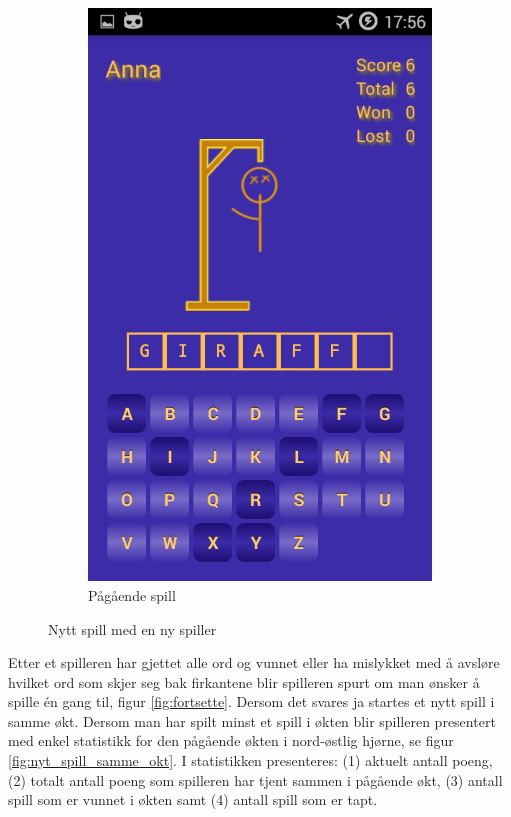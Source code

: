 \begin{figure}[ht]
\begin{subfigure}[b]{0.25\textwidth}
        \includegraphics[width=\textwidth]{./img/bruksanvisning/4.png}
        \caption{Pågående spill}
        \label{fig:spill_igang}
    \end{subfigure}
    \caption{Nytt spill med en ny spiller}\label{fig:new_game_activities}
\end{figure}

Etter et spilleren har gjettet alle ord og vunnet eller ha mislykket med å avsløre hvilket ord som skjer seg bak firkantene blir spilleren spurt om man ønsker å spille én gang til, figur \ref{fig:fortsette}. Dersom det svares ja startes et nytt spill i samme økt. Dersom man har spilt minst et spill i økten blir spilleren presentert med enkel statistikk for den pågående økten i nord-østlig hjørne, se figur \ref{fig:nyt_spill_samme_okt}. I statistikken presenteres: (1) aktuelt antall poeng, (2) totalt antall poeng som spilleren har tjent sammen i pågående økt, (3) antall spill som er vunnet i økten samt (4) antall spill som er tapt. 

